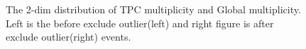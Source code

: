 		
 	\begin{figure}[h]
		\begin{center}
        \caption{The 2-dim distribution of TPC multiplicity and Global multiplicity. Left is the before exclude outlier(left) and right figure is after exclude outlier(right) events. }
        \label{fig:outlier}
        \end{center}   
     \end{figure}



